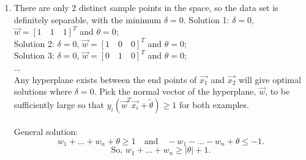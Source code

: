 \documentclass[11pt]{article}
\begin{document}
\begin{enumerate}[label=(\alph*)]
\item
    There are only 2 distinct sample points in the space, so the data set is definitely separable, with the minimum $\delta = 0$.
    Solution 1: $\delta = 0$, $\vec{w} = [1\quad1\quad1]^T$ and $\theta = 0$;\\
    Solution 2: $\delta = 0$, $\vec{w} = [1\quad0\quad0]^T$ and $\theta = 0$;\\
    Solution 3: $\delta = 0$, $\vec{w} = [0\quad1\quad0]^T$ and $\theta = 0$;\\
    ...\\
    Any hyperplane exists between the end points of $\vec{x_1}$ and $\vec{x_2}$ will give optimal solutions where $\delta = 0$. Pick the normal vector of the hyperplane, $\vec{w}$, to be sufficiently large so that  $y_i(\vec{w}^T\vec{x_i} + \tilde{\theta}) \geq 1$ for both examples.\\\\
    General solution:
    $$w_1 + ... + w_n + \theta \geq 1 \quad\text{and}\quad -w_1 - ... - w_n + \theta \leq -1.$$
    $$\text{So, } w_1 + ... + w_n \geq |\theta| + 1.$$


\end{enumerate}
\end{document}
